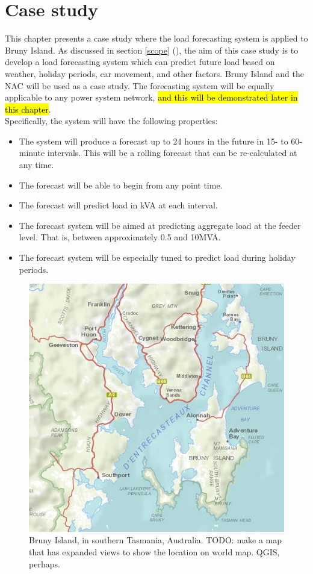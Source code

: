 \chapter{Case study}
This chapter presents a case study where the load forecasting system is applied to Bruny Island.
As discussed in section \ref{scope} (), the aim of this case study is to develop a load forecasting system which can predict future load based on weather, holiday periods, car movement, and other factors. 
Bruny Island and the NAC will be used as a case study. 
The forecasting system will be equally applicable to any power system network, \hl{and this will be demonstrated later in this chapter}.
\\
Specifically, the system will have the following properties:
\begin{itemize}
	\item The system will produce a forecast up to 24 hours in the future in 15- to 60-minute intervals. This will be a rolling forecast that can be re-calculated at any time.
	\item The forecast will be able to begin from any point time.
	\item The forecast will predict load in kVA at each interval.
	\item The forecast system will be aimed at predicting aggregate load at the feeder level. That is, between approximately 0.5 and 10MVA.
	\item The forecast system will be especially tuned to predict load during holiday periods.
\end{itemize}

\begin{figure}
	\centering
	\includegraphics[width=0.35\linewidth]{images/bruny-basic}
	\caption{Bruny Island, in southern Tasmania, Australia. TODO: make a map that has expanded views to show the location on world map. QGIS, perhaps.}
	\label{fig:bruny-basic}
\end{figure}


